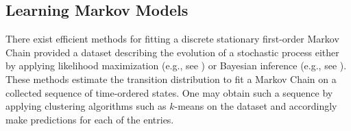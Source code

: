 

\newpage

\subsection{Learning Markov Models}
\label{sec:learning-markov-models}

There exist efficient methods for fitting a discrete stationary first-order Markov Chain provided a dataset describing the evolution of a stochastic process either by applying likelihood maximization (e.g., see \cite{bacciu2015probabilistic, barberBRML2012, lee1968maximum, teodorescu2009maximum}) or Bayesian inference (e.g., see \cite{barberBRML2012, lee1968maximum, minka2003bayesian}).
These methods estimate the transition distribution to fit a Markov Chain on a collected sequence of time-ordered states.
One may obtain such a sequence by applying clustering algorithms such as $k$-means on the dataset and accordingly make predictions for each of the entries.

